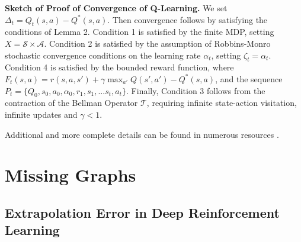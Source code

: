 \documentclass{article}
\newcommand{\y}{\gamma}
\newcommand{\al}{\alpha}
\begin{document}
\bigskip

\textbf{Sketch of Proof of Convergence of Q-Learning.} We set $\Delta_t = Q_t(s,a) - Q^*(s,a)$. Then convergence follows by satisfying the conditions of Lemma 2. Condition 1 is satisfied by the finite MDP, setting $X = \mathcal{S} \times \mathcal{A}$. Condition 2 is satisfied by the assumption of Robbins-Monro stochastic convergence conditions on the learning rate $\al_t$, setting $\zeta_t = \al_t$. Condition 4 is satisfied by the bounded reward function, where $F_t(s,a) = r(s,a,s') + \y \max_{a'} Q(s', a') - Q^*(s,a)$, and the sequence $P_t = \{Q_0, s_0, a_0, \al_0, r_1, s_1, ...s_t, a_t\}$. Finally, Condition 3 follows from the contraction of the Bellman Operator $\mathcal{T}$, requiring infinite state-action visitation, infinite updates and $\y < 1$. 

Additional and more complete details can be found in numerous resources \cite{dayan1992q, singh2000convergence, melo2001convergence}. 

\clearpage


\section{Missing Graphs}

\subsection{Extrapolation Error in Deep Reinforcement Learning}
\end{document}

